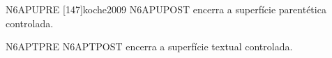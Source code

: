 \documentclass{abntexto-ufc}
\begin{document}
\textual

\noindent N6APUPRE [147]{koche2009} N6APUPOST encerra a superfície parentética controlada.

\noindent N6APTPRE  N6APTPOST encerra a superfície textual controlada.
\end{document}
